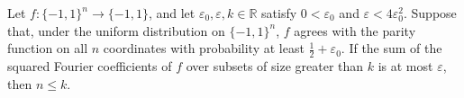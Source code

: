 \begin{theorem}
\label{FABL.parityAgreement_forces_concentration_cutoff}
\leanok
{}
Let $f:\{-1,1\}^n\to\{-1,1\}$, and let $\varepsilon_0,\varepsilon,k\in\mathbb R$ satisfy
$0<\varepsilon_0$ and $\varepsilon<4\varepsilon_0^2$. Suppose that, under the uniform
distribution on $\{-1,1\}^n$, $f$ agrees with the parity function on all $n$ coordinates
with probability at least $\tfrac12+\varepsilon_0$. If the sum of the squared Fourier
coefficients of $f$ over subsets of size greater than $k$ is at most $\varepsilon$, then
$n\le k$.
\end{theorem}
